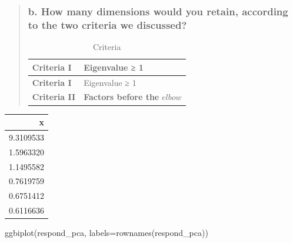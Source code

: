 \documentclass[
]{article}
\newenvironment{Shaded}{\begin{snugshade}}{\end{snugshade}}
\newcommand{\AttributeTok}[1]{\textcolor[rgb]{0.77,0.63,0.00}{#1}}
\newcommand{\FunctionTok}[1]{\textcolor[rgb]{0.00,0.00,0.00}{#1}}
\newcommand{\NormalTok}[1]{#1}
\newcommand{\OtherTok}[1]{\textcolor[rgb]{0.56,0.35,0.01}{#1}}
\newcommand{\SpecialCharTok}[1]{\textcolor[rgb]{0.00,0.00,0.00}{#1}}
\begin{document}
\begin{quote}
\hypertarget{b.-how-many-dimensions-would-you-retain-according-to-the-two-criteria-we-discussed}{%
\subsubsection{b. How many dimensions would you retain, according to the
two criteria we
discussed?}\label{b.-how-many-dimensions-would-you-retain-according-to-the-two-criteria-we-discussed}}

\begin{longtable}[]{@{}ll@{}}
\caption{Criteria}\tabularnewline
\toprule
\textbf{Criteria I} & Eigenvalue ≥ 1 \\
\midrule
\endfirsthead
\toprule
\textbf{Criteria I} & Eigenvalue ≥ 1 \\
\midrule
\endhead
\textbf{Criteria II} & \textbf{Factors before the} \(elbow\) \\
\bottomrule
\end{longtable}
\end{quote}

\begin{Shaded}
\end{Shaded}

\begin{longtable}[]{@{}r@{}}
\toprule
x \\
\midrule
\endhead
9.3109533 \\
1.5963320 \\
1.1495582 \\
0.7619759 \\
0.6751412 \\
0.6116636 \\
\bottomrule
\end{longtable}

\begin{Shaded}
\begin{Highlighting}[]
\FunctionTok{ggbiplot}\NormalTok{(respond\_pca, }\AttributeTok{labels=}\FunctionTok{rownames}\NormalTok{(respond\_pca))}
\end{Highlighting}
\end{Shaded}
\end{document}
